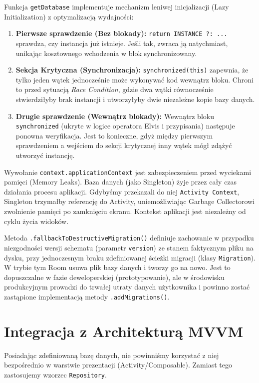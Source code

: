 Funkcja \texttt{getDatabase} implementuje mechanizm leniwej inicjalizacji (Lazy Initialization) z optymalizacją wydajności:
\begin{enumerate}
    \item \textbf{Pierwsze sprawdzenie (Bez blokady):} \texttt{return INSTANCE ?: ...} sprawdza, czy instancja już istnieje. Jeśli tak, zwraca ją natychmiast, unikając kosztownego wchodzenia w blok synchronizowany.
    \item \textbf{Sekcja Krytyczna (Synchronizacja):} \texttt{synchronized(this)} zapewnia, że tylko jeden wątek jednocześnie może wykonywać kod wewnątrz bloku. Chroni to przed sytuacją \textit{Race Condition}, gdzie dwa wątki równocześnie stwierdziłyby brak instancji i utworzyłyby dwie niezależne kopie bazy danych.
    \item \textbf{Drugie sprawdzenie (Wewnątrz blokady):} Wewnątrz bloku \texttt{synchronized} (ukryte w logice operatora Elvis i przypisania) następuje ponowna weryfikacja. Jest to konieczne, gdyż między pierwszym sprawdzeniem a wejściem do sekcji krytycznej inny wątek mógł zdążyć utworzyć instancję.
\end{enumerate}

Wywołanie \texttt{context.applicationContext} jest zabezpieczeniem przed wyciekami pamięci (Memory Leaks).
Baza danych (jako Singleton) żyje przez cały czas działania procesu aplikacji. Gdybyśmy przekazali do niej \texttt{Activity Context}, Singleton trzymałby referencję do Activity, uniemożliwiając Garbage Collectorowi zwolnienie pamięci po zamknięciu ekranu. Kontekst aplikacji jest niezależny od cyklu życia widoków.

Metoda \texttt{.fallbackToDestructiveMigration()} definiuje zachowanie w przypadku niezgodności wersji schematu (parametr \texttt{version}) ze stanem faktycznym pliku na dysku, przy jednoczesnym braku zdefiniowanej ścieżki migracji (klasy \texttt{Migration}).
W trybie tym Room usuwa plik bazy danych i tworzy go na nowo. Jest to dopuszczalne w fazie deweloperskiej (prototypowanie), ale w środowisku produkcyjnym prowadzi do trwałej utraty danych użytkownika i powinno zostać zastąpione implementacją metody \texttt{.addMigrations()}.

\section{Integracja z Architekturą MVVM}

Posiadając zdefiniowaną bazę danych, nie powinniśmy korzystać z niej bezpośrednio w warstwie prezentacji (Activity/Composable). Zamiast tego zastosujemy wzorzec \texttt{Repository}.

